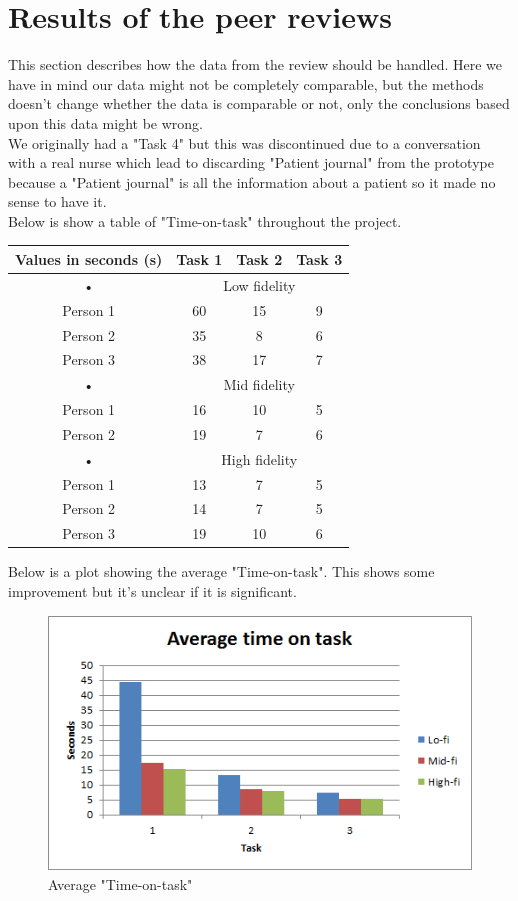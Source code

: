 \section{Results of the peer reviews}
This section describes how the data from the review should be handled. Here we have in mind our data might not be completely comparable, but the methods doesn't change whether the data is comparable or not, only the conclusions based upon this data might be wrong. \\
We originally had a "Task 4" but this was discontinued due to a conversation with a real nurse which lead to discarding "Patient journal" from the prototype because a "Patient journal" is all the information about a patient so it made no sense to have it.\\
Below is show a table of "Time-on-task" throughout the project.\\
\begin{table}[H]
\centering
\begin{tabular}{|c|c|c|c|}
\hline 
Values in seconds (s) & Task 1 & Task 2 & Task 3 \\ 
\hline 
• & \multicolumn{3}{c|}{Low fidelity} \\ 
\hline 
Person 1 & 60 & 15 & 9 \\ 
\hline 
Person 2 & 35 & 8 & 6 \\ 
\hline 
Person 3 & 38 & 17 & 7 \\ 
\hline 
• & \multicolumn{3}{c|}{Mid fidelity} \\ 
\hline 
Person 1 & 16 & 10 & 5 \\ 
\hline 
Person 2 & 19 & 7 & 6 \\ 
\hline 
• & \multicolumn{3}{c|}{High fidelity} \\ 
\hline 
Person 1 & 13 & 7 & 5 \\ 
\hline 
Person 2 & 14 & 7 & 5 \\ 
\hline 
Person 3 & 19 & 10 & 6 \\ 
\hline 
\end{tabular} 
\end{table}
Below is a plot showing the average "Time-on-task". This shows some improvement but it's unclear if it is significant.
\begin{figure}[H]
\centering
\includegraphics[width=.8\textwidth]{billeder/endeliggraf.png}
\caption{Average "Time-on-task"}
\end{figure}
